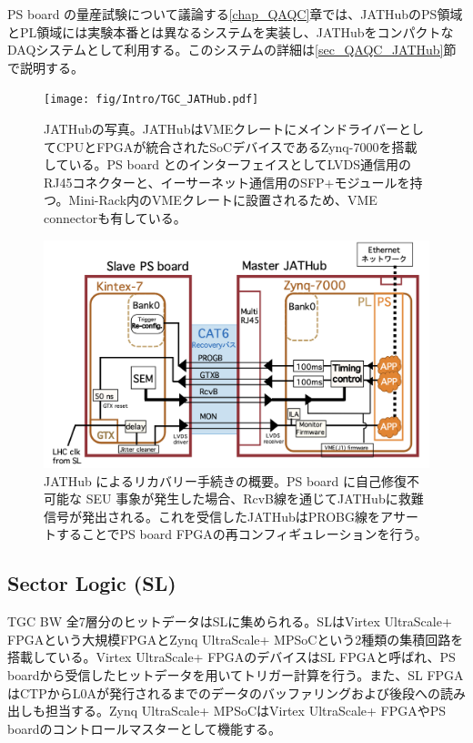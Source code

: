     PS board の量産試験について議論する\ref{chap_QAQC}章では、JATHubのPS領域とPL領域には実験本番とは異なるシステムを実装し、JATHubをコンパクトなDAQシステムとして利用する。このシステムの詳細は\ref{sec_QAQC_JATHub}節で説明する。



    \begin{figure} 
        \centering
        \texttt{[image: fig/Intro/TGC\_JATHub.pdf]}
        \caption[JATHubの写真]{JATHubの写真\cite{mt_aoki}。JATHubはVMEクレートにメインドライバーとしてCPUとFPGAが統合されたSoCデバイスであるZynq-7000を搭載している。PS board とのインターフェイスとしてLVDS通信用のRJ45コネクターと、イーサーネット通信用のSFP+モジュールを持つ。Mini-Rack内のVMEクレートに設置されるため、VME connectorも有している。}
        \label{TGC_JATHub}
    \end{figure}

    \begin{figure} 
    \centering
    \includegraphics[width=16cm]{fig/QAQC/JATHubsem.png}
    \caption[JATHub によるリカバリー手続きの概要]{JATHub によるリカバリー手続きの概要\cite{mt_atanaka}。PS board に自己修復不可能な SEU 事象が発生した場合、RcvB線を通じてJATHubに救難信号が発出される。これを受信したJATHubはPROBG線をアサートすることでPS board FPGAの再コンフィギュレーションを行う。}
    \label{JATHubsem}
    \end{figure}

        \subsection*{Sector Logic  (SL) }
TGC BW 全7層分のヒットデータはSLに集められる。SLはVirtex UltraScale+ FPGAという大規模FPGAとZynq UltraScale+ MPSoCという2種類の集積回路を搭載している。Virtex UltraScale+ FPGAのデバイスはSL FPGAと呼ばれ、PS boardから受信したヒットデータを用いてトリガー計算を行う。また、SL FPGAはCTPからL0Aが発行されるまでのデータのバッファリングおよび後段への読み出しも担当する。Zynq UltraScale+ MPSoCはVirtex UltraScale+ FPGAやPS boardのコントロールマスターとして機能する。

